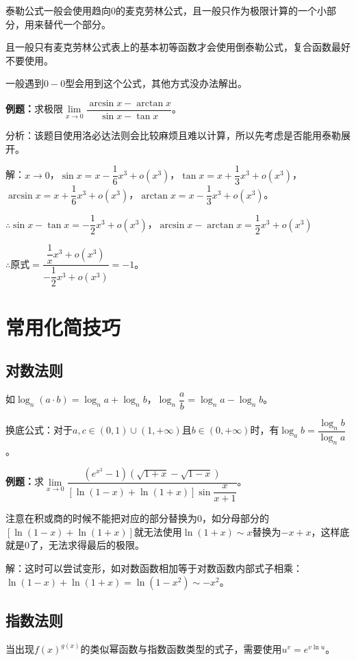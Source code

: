\documentclass[UTF8, 12pt]{ctexart}
\begin{document}
泰勒公式一般会使用趋向0的麦克劳林公式，且一般只作为极限计算的一个小部分，用来替代一个部分。

且一般只有麦克劳林公式表上的基本初等函数才会使用倒泰勒公式，复合函数最好不要使用。

一般遇到$0-0$型会用到这个公式，其他方式没办法解出。

\textbf{例题：}求极限$\lim\limits_{x\to 0}\dfrac{\arcsin x-\arctan x}{\sin x-\tan x}$。\medskip

分析：该题目使用洛必达法则会比较麻烦且难以计算，所以先考虑是否能用泰勒展开。

解：$x\to 0$，$\sin x=x-\dfrac{1}{6}x^3+o(x^3)$，$\tan x=x+\dfrac{1}{3}x^3+o(x^3)$，$\arcsin x=x+\dfrac{1}{6}x^3+o(x^3)$，$\arctan x=x-\dfrac{1}{3}x^3+o(x^3)$。

$\therefore \sin x-\tan x=-\dfrac{1}{2}x^3+o(x^3)$，$\arcsin x-\arctan x=\dfrac{1}{2}x^3+o(x^3)$

$\therefore \text{原式}=\dfrac{\dfrac{1}{x}x^3+o(x^3)}{-\dfrac{1}{2}x^3+o(x^3)}=-1$。

\section{常用化简技巧}

\subsection{对数法则}

如$\log_n(a\cdot b)=\log_n a+\log_n b$，$\log_n\dfrac{a}{b}=\log_na-\log_nb$。

换底公式：对于$a,c\in(0,1)\cup(1,+\infty)$且$b\in(0,+\infty)$时，有$\log_ab=\dfrac{\log_nb}{\log_na}$。

\textbf{例题：}求$\lim\limits_{x\to 0}\dfrac{(e^{x^2}-1)(\sqrt{1+x}-\sqrt{1-x})}{[\ln(1-x)+\ln(1+x)]\sin\dfrac{x}{x+1}}$。

注意在积或商的时候不能把对应的部分替换为0，如分母部分的$[\ln(1-x)+\ln(1+x)]$就无法使用$\ln(1+x)\sim x$替换为$-x+x$，这样底就是0了，无法求得最后的极限。

解：这时可以尝试变形，如对数函数相加等于对数函数内部式子相乘：$\ln(1-x)+\ln(1+x)=\ln(1-x^2)\sim-x^2$。

\subsection{指数法则}

当出现$f(x)^{g(x)}$的类似幂函数与指数函数类型的式子，需要使用$u^v=e^{v\ln u}$。
\end{document}
